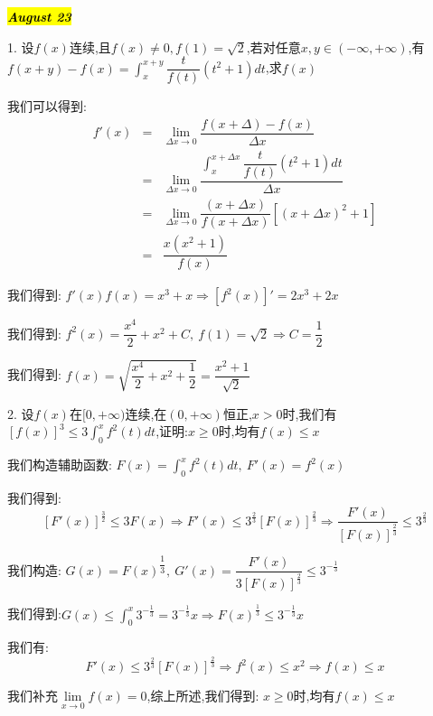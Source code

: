 \hl{\textbf{\textit{August 23}}}

1. 设$f(x)$连续,且$f(x)\neq 0,f(1)=\sqrt{2}$,若对任意$x,y\in(-\infty,+\infty)$,有$f(x+y)-f(x)=\int_{x}^{x+y}\dfrac{t}{f(t)}(t^2+1)dt$,求$f(x)$
\begin{solution}

	我们可以得到:
	\begin{eqnarray*}
		f'(x)&=&\lim\limits_{\Delta x\rightarrow 0}\dfrac{f(x+\Delta)-f(x)}{\Delta x}\\
		&=&\lim\limits_{\Delta x\rightarrow 0}\dfrac{\int_{x}^{x+\Delta x}\dfrac{t}{f(t)}(t^2+1)dt}{\Delta x}\\
		&=&\lim\limits_{\Delta x\rightarrow 0}\dfrac{(x+\Delta x)}{f(x+\Delta x)}\left[ (x+\Delta x)^2+1\right] \\
		&=&\dfrac{x(x^2+1)}{f(x)}
	\end{eqnarray*}

	我们得到:  $f'(x)f(x)=x^3+x\Rightarrow [f^2(x)]'=2x^3+2x$
	
	我们得到:  $f^{2}(x)=\dfrac{x^4}{2}+x^2+C,\ f(1)=\sqrt{2}\Rightarrow C=\dfrac{1}{2}$
	
	我们得到:  $f(x)=\sqrt{\dfrac{x^4}{2}+x^2+\dfrac{1}{2}}=\dfrac{x^2+1}{\sqrt{2}}$
\end{solution}

2. 设$f(x)$在$[0,+\infty)$连续,在$(0,+\infty)$恒正,$x>0$时,我们有$\left[ f(x)\right]^3\leq 3\int_{0}^{x}f^{2}(t)dt$,证明:$x\geq 0\text{时,均有}f(x)\leq x$
\begin{solution}

	我们构造辅助函数:  $F(x)=\int_{0}^{x}f^{2}(t)dt,\ F'(x)=f^{2}(x)$
	
	我们得到:  $$[F'(x)]^{\frac{3}{2}}\leq 3F(x)\Rightarrow F'(x)\leq 3^{\frac{2}{3}}[F(x)]^{\frac{2}{3}}\Rightarrow \dfrac{F'(x)}{[F(x)]^{\frac{2}{3}}}\leq 3^{\frac{2}{3}}$$
	
	我们构造:  $G(x)=F(x)^{\dfrac{1}{3}},\ G'(x)=\dfrac{F'(x)}{3[F(x)]^{\frac{2}{3}}}\leq 3^{-\frac{1}{3}}$
	
	我们得到:$G(x)\leq \int_{0}^{x}3^{-\frac{1}{3}}=3^{-\frac{1}{3}}x\Rightarrow F(x)^{\frac{1}{3}}\leq3^{-\frac{1}{3}}x$
	
	我们有:$$F'(x)\leq 3^{\frac{2}{3}}[F(x)]^{\frac{2}{3}}\Rightarrow f^{2}(x)\leq x^2\Rightarrow f(x)\leq x$$

	我们补充$\lim\limits_{x\rightarrow 0}f(x)=0$,综上所述,我们得到:  $x\geq 0\text{时,均有}f(x)\leq x$	
	
\end{solution}

